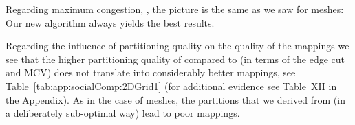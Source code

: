 \documentclass[pdftex]{llncs}
\begin{document}
\begin{table}[htb]
\caption{Mapping of complex networks onto 2DTorus(). Times
  ,  and  are in {\bf milliseconds}.}
\begin{center}
\end{center}
\label{tab:app:social:2DTorus1}
\end{table}

Regarding maximum congestion, , the picture is the same as we saw
for meshes: Our new algorithm  always yields the best results.

Regarding the influence of partitioning quality on the quality of the
mappings we see that the higher partitioning quality of 
compared to  (in terms of the edge cut and MCV) does not
translate into considerably better mappings, see
Table~\ref{tab:app:socialComp:2DGrid1} (for additional evidence see
Table~XII in the Appendix). As in the case of meshes, the
partitions that we derived from  (in a deliberately
sub-optimal way) lead to poor mappings.
\end{document}
